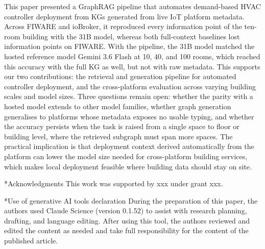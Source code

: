 \documentclass[twocolumn, 10pt, a4paper]{article}
\makeatletter
\renewcommand\section{\@startsection{section}{1}{\z@}{6pt}{3pt}{\normalfont\large\bfseries}}
\makeatother
\begin{document}
This paper presented a GraphRAG pipeline that automates demand-based HVAC controller deployment from KGs generated from live IoT platform metadata.
Across FIWARE and ioBroker, it reproduced every information point of the ten-room building with the 31B model, whereas both full-context baselines lost information points on FIWARE.
With the pipeline, the 31B model matched the hosted reference model Gemini 3.6 Flash at 10, 40, and 100 rooms, which reached this accuracy with the full KG as well, but not with raw metadata.
This supports our two contributions: the retrieval and generation pipeline for automated controller deployment, and the cross-platform evaluation across varying building scales and model sizes.
Three questions remain open: whether the parity with a hosted model extends to other model families, whether graph generation generalises to platforms whose metadata exposes no usable typing, and whether the accuracy persists when the task is raised from a single space to floor or building level, where the retrieved subgraph must span more spaces.
The practical implication is that deployment context derived automatically from the platform can lower the model size needed for cross-platform building services, which makes local deployment feasible where building data should stay on site.

\section*{Acknowledgments}
This work was supported by xxx under grant xxx.

\section*{Use of generative AI tools declaration}
During the preparation of this paper, the authors used Claude Science (version 0.1.52) to assist with research planning, drafting, and language editing.
After using this tool, the authors reviewed and edited the content as needed and take full responsibility for the content of the published article.


\end{document}
